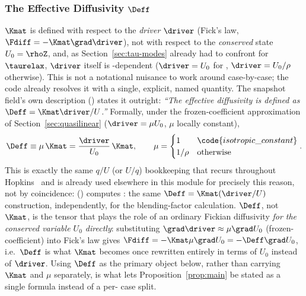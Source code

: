 \subsubsection{The Effective Diffusivity $\Deff$}
\label{sec:effective-diffusivity}
$\Kmat$ is defined with respect to the \emph{driver} $\driver$ (Fick's
law, $\Fdiff=-\Kmat\grad\driver$), not with respect to the
\emph{conserved} state $U_0=\rhoZ$, and, as Section~\ref{sec:tau-modes}
already had to confront for $\taurelax$, $\driver$ itself is
-dependent ($\driver=U_0$ for
, $\driver=U_0/\rho$ otherwise). This is not a
notational nuisance to work around case-by-case; the code already
resolves it with a single, explicit, named quantity. The 
snapshot field's own description () states it
outright: \emph{``The effective diffusivity is defined as $\Deff =
\Kmat\driver/U$.''} Formally, under the frozen-coefficient approximation
of Section~\ref{sec:quasilinear} ($\driver=\mu U_0$, $\mu$ locally
constant),
\begin{equation}
  \label{eq:D_definition}
  \Deff \equiv \mu\,\Kmat = \frac{\driver}{U_0}\,\Kmat ,
  \qquad
  \mu = \begin{cases} 1 & \code{isotropic\_constant} \\ 1/\rho & \text{otherwise} \end{cases} .
\end{equation}
This is exactly the same $q/U$ (or $U/q$) bookkeeping that recurs
throughout Hopkins~\citeyear{Hopkins2017diffusion} and is already used
elsewhere in this module for precisely this reason, not by coincidence:
() computes
: the same
$\Deff=\Kmat(\driver/U)$ construction, independently, for the
blending-factor calculation. $\Deff$, not $\Kmat$, is the tensor that
plays the role of an ordinary Fickian diffusivity \emph{for the conserved
variable $U_0$ directly}: substituting $\grad\driver\approx\mu\grad U_0$
(frozen-coefficient) into Fick's law gives $\Fdiff=-\Kmat\mu\grad U_0 =
-\Deff\grad U_0$, i.e.\ $\Deff$ is what $\Kmat$ becomes once rewritten
entirely in terms of $U_0$ instead of $\driver$. Using $\Deff$ as the
primary object below, rather than carrying $\Kmat$ and $\mu$ separately,
is what lets Proposition~\ref{prop:main} be stated as a single formula
instead of a per- case split.

